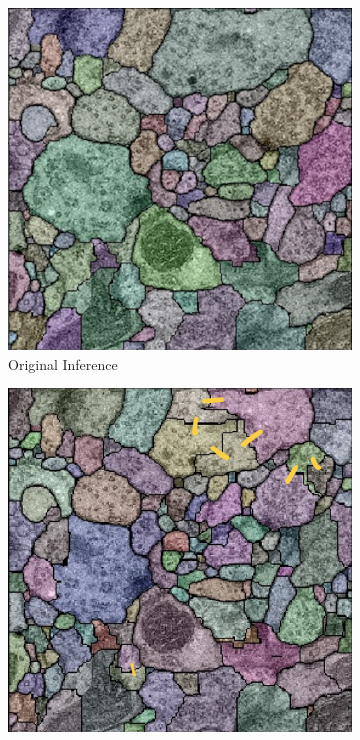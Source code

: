 \documentclass[12pt, a4paper]{scrartcl}
\begin{document}
\begin{figure}[H]
\centering
\begin{subfigure}{.3\textwidth}
  \centering
  \includegraphics[width=.9\linewidth]{oi2}
  \caption{Original Inference}
  \label{fig:ai1}
\end{subfigure}%
\begin{subfigure}{.3\textwidth}
  \centering
  \includegraphics[width=.9\linewidth]{600}

\end{subfigure}
\end{figure}
\end{document}
